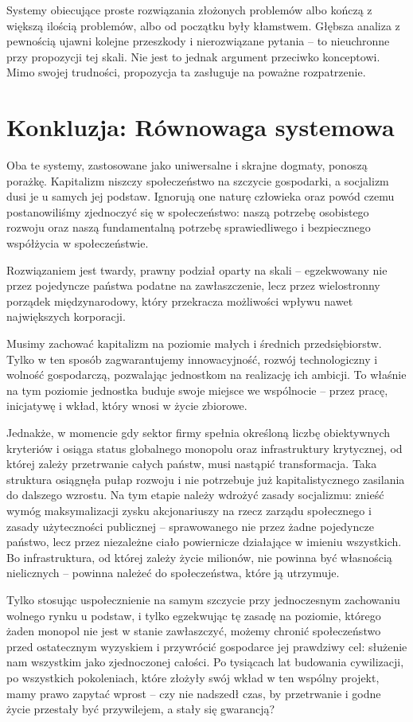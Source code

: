 \documentclass[12pt,a4paper]{article}
\begin{document}
Systemy obiecujące proste rozwiązania złożonych problemów albo kończą
z większą ilością problemów, albo od początku były kłamstwem. Głębsza
analiza z pewnością ujawni kolejne przeszkody i nierozwiązane pytania --
to nieuchronne przy propozycji tej skali. Nie jest to jednak argument
przeciwko konceptowi. Mimo swojej trudności, propozycja ta zasługuje na
poważne rozpatrzenie.

\section*{Konkluzja: Równowaga systemowa}

Oba te systemy, zastosowane jako uniwersalne i skrajne dogmaty, ponoszą porażkę. Kapitalizm niszczy społeczeństwo na szczycie gospodarki, a socjalizm dusi je u samych jej podstaw. Ignorują one naturę człowieka oraz powód czemu postanowiliśmy zjednoczyć się w społeczeństwo: naszą potrzebę osobistego rozwoju oraz naszą fundamentalną potrzebę sprawiedliwego i bezpiecznego współżycia w społeczeństwie.

Rozwiązaniem jest twardy, prawny podział oparty na skali -- egzekwowany nie przez pojedyncze państwa podatne na zawłaszczenie, lecz przez wielostronny porządek międzynarodowy, który przekracza możliwości wpływu nawet największych korporacji.

Musimy zachować kapitalizm na poziomie małych i średnich przedsiębiorstw. Tylko w ten sposób zagwarantujemy innowacyjność, rozwój technologiczny i wolność gospodarczą, pozwalając jednostkom na realizację ich ambicji. To właśnie na tym poziomie jednostka buduje swoje miejsce we wspólnocie -- przez pracę, inicjatywę i wkład, który wnosi w życie zbiorowe.

Jednakże, w momencie gdy sektor firmy spełnia określoną liczbę obiektywnych kryteriów i osiąga status globalnego monopolu oraz infrastruktury krytycznej, od której zależy przetrwanie całych państw, musi nastąpić transformacja. Taka struktura osiągnęła pułap rozwoju i nie potrzebuje już kapitalistycznego zasilania do dalszego wzrostu. Na tym etapie należy wdrożyć zasady socjalizmu: znieść wymóg maksymalizacji zysku akcjonariuszy na rzecz zarządu społecznego i zasady użyteczności publicznej -- sprawowanego nie przez żadne pojedyncze państwo, lecz przez niezależne ciało powiernicze działające w imieniu wszystkich. Bo infrastruktura, od której zależy życie milionów, nie powinna być własnością nielicznych -- powinna należeć do społeczeństwa, które ją utrzymuje.

Tylko stosując uspołecznienie na samym szczycie przy jednoczesnym zachowaniu wolnego rynku u podstaw, i tylko egzekwując tę zasadę na poziomie, którego żaden monopol nie jest w stanie zawłaszczyć, możemy chronić społeczeństwo przed ostatecznym wyzyskiem i przywrócić gospodarce jej prawdziwy cel: służenie nam wszystkim jako zjednoczonej całości. Po tysiącach lat budowania cywilizacji, po wszystkich pokoleniach, które złożyły swój wkład w ten wspólny projekt, mamy prawo zapytać wprost -- czy nie nadszedł czas, by przetrwanie i godne życie przestały być przywilejem, a stały się gwarancją?
\end{document}
